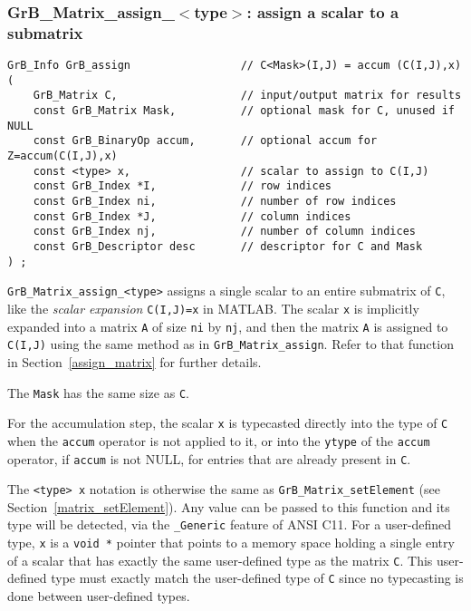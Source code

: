 \documentclass[12pt]{article}
\begin{document}
{%
\subsubsection{{\sf GrB\_Matrix\_assign\_$<$type$>$:} assign a scalar to a submatrix}
\label{assign_matrix_scalar}

\begin{mdframed}[userdefinedwidth=6in]
{\footnotesize
\begin{verbatim}
GrB_Info GrB_assign                 // C<Mask>(I,J) = accum (C(I,J),x)
(
    GrB_Matrix C,                   // input/output matrix for results
    const GrB_Matrix Mask,          // optional mask for C, unused if NULL
    const GrB_BinaryOp accum,       // optional accum for Z=accum(C(I,J),x)
    const <type> x,                 // scalar to assign to C(I,J)
    const GrB_Index *I,             // row indices
    const GrB_Index ni,             // number of row indices
    const GrB_Index *J,             // column indices
    const GrB_Index nj,             // number of column indices
    const GrB_Descriptor desc       // descriptor for C and Mask
) ;
\end{verbatim} } \end{mdframed}

\verb'GrB_Matrix_assign_<type>' assigns a single scalar to an entire
submatrix of \verb'C', like the {\em scalar expansion} \verb'C(I,J)=x' in
MATLAB.  The scalar \verb'x' is implicitly expanded into a matrix \verb'A' of
size \verb'ni' by \verb'nj', and then the matrix \verb'A' is assigned to
\verb'C(I,J)' using the same method as in \verb'GrB_Matrix_assign'.  Refer
to that function in Section~\ref{assign_matrix} for further details.

The \verb'Mask' has the same size as \verb'C'.

For the accumulation step, the scalar \verb'x' is typecasted directly into the
type of \verb'C' when the \verb'accum' operator is not applied to it, or into
the \verb'ytype' of the \verb'accum' operator, if \verb'accum' is not NULL, for
entries that are already present in \verb'C'.

The \verb'<type> x' notation is otherwise the same as
\verb'GrB_Matrix_setElement' (see Section~\ref{matrix_setElement}).  Any value
can be passed to this function and its type will be detected, via the
\verb'_Generic' feature of ANSI C11.  For a user-defined type, \verb'x' is a
\verb'void *' pointer that points to a memory space holding a single entry of a
scalar that has exactly the same user-defined type as the matrix \verb'C'.
This user-defined type must exactly match the user-defined type of \verb'C'
since no typecasting is done between user-defined types.

}
\end{document}
